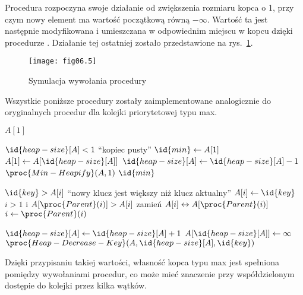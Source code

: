 \exercise %
Procedura  rozpoczyna swoje działanie od zwiększenia rozmiaru kopca o 1, przy czym nowy element ma wartość początkową równą $-\infty$. Wartość ta jest następnie modyfikowana i umieszczana w odpowiednim miejscu w kopcu dzięki procedurze . Działanie tej ostatniej zostało przedstawione na rys.~\ref{fig:6.5-2}.
\begin{figure}[ht]
	\begin{center}
		\texttt{[image: fig06.5]}
	\end{center}
	\caption{Symulacja wywołania procedury } \label{fig:6.5-2}
\end{figure}

\exercise %
Wszystkie poniższe procedury zostały zaimplementowane analogicznie do oryginalnych procedur dla kolejki priorytetowej typu max.
\begin{codebox}
\li	\Return $A[1]$
\end{codebox}

\begin{codebox}
\li	\If $\id{heap-size}[A]<1$
\li		\Then \Error ``kopiec pusty''
		\End
\li	$\id{min}\gets A[1]$
\li	$A[1]\gets A[\id{heap-size}[A]]$
\li	$\id{heap-size}[A]\gets\id{heap-size}[A]-1$
\li	$\proc{Min-Heapify}(A,1)$
\li	\Return $\id{min}$
\end{codebox}

\begin{codebox}
\li	\If $\id{key}>A[i]$
\li		\Then
			\Error ``nowy klucz jest większy niż klucz aktualny''
		\End
\li	$A[i]\gets\id{key}$
\li	\While $i>1$ i $A[\proc{Parent}(i)]>A[i]$
\li		\Do
			zamień $A[i]\leftrightarrow A[\proc{Parent}(i)]$
\li			$i\gets\proc{Parent}(i)$
		\End
\end{codebox}

\begin{codebox}
\li	$\id{heap-size}[A]\gets\id{heap-size}[A]+1$
\li	$A[\id{heap-size}[A]]\gets\infty$
\li	$\proc{Heap-Decrease-Key}(A,\id{heap-size}[A],\id{key})$
\end{codebox}

\exercise %
Dzięki przypisaniu takiej wartości, własność kopca typu max jest spełniona pomiędzy wywołaniami procedur, co może mieć znaczenie przy współdzielonym dostępie do kolejki przez kilka wątków.

